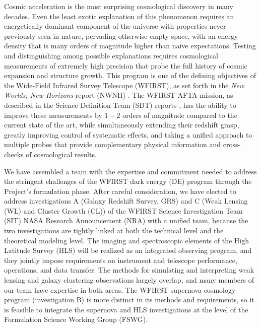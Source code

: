 %
%


Cosmic acceleration is the most surprising cosmological discovery in
many decades.  Even the least exotic explanation of this phenomenon
requires an energetically dominant component of the universe with
properties never previously seen in nature, pervading otherwise
empty space, with an energy density that is many orders of magnitude
higher than naive expectations. Testing and distinguishing among possible  explanations requires cosmological
measurements of extremely high precision that probe the full history of
cosmic expansion and structure growth.
This program is one of the defining objectives of the Wide-Field
Infrared Survey Telescope (WFIRST), as set forth in the {\it New Worlds, New Horizons} 
report (NWNH) \cite{NWNH2010}.  The WFIRST-AFTA mission, as described in the Science
Definition Team (SDT) reports \citep[hereafter SDT13 and SDT15 respectively]{Spergel2013, Spergel2015}, has the ability to improve these
measurements by $1-2$ orders of magnitude compared to the current
state of the art, while simultaneously extending their redshift grasp,
greatly improving control of systematic effects, and taking a unified
approach to multiple probes that provide complementary physical information
and cross-checks of cosmological results.

We have assembled a team with the expertise and commitment needed to address the
stringent challenges of the WFIRST dark energy (DE) program through
the Project's formulation phase.  After careful consideration, we
have elected to address investigations A (Galaxy Redshift Survey, GRS) and
C (Weak Lensing (WL) and Cluster Growth (CL)) of the WFIRST Science
Investigation Team (SIT) NASA Research Announcement (NRA) with a
unified team, because the two investigations are tightly linked 
at both the technical level and the theoretical modeling level.
The imaging and spectroscopic elements of the High Latitude Survey (HLS)
will be realized as an integrated observing program, and they jointly
impose requirements on instrument and telescope performance, operations,
and data transfer.  The methods for simulating and interpreting
weak lensing and galaxy clustering observations largely overlap,
and many members of our team have expertise in both areas.
The WFIRST supernova cosmology program (investigation B) is more
distinct in its methods and requirements, so it is feasible to
integrate the supernova and HLS investigations at the level of the
Formulation Science Working Group (FSWG).

